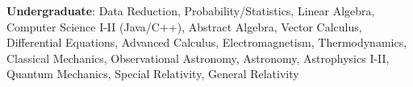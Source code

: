 \noindent\textbf{Undergraduate}:
    Data Reduction, Probability/Statistics, Linear Algebra, Computer
    Science I-II (Java/C++), Abstract Algebra, Vector Calculus,
    Differential Equations, Advanced Calculus, Electromagnetism,
    Thermodynamics, Classical Mechanics, Observational Astronomy,
    Astronomy, Astrophysics I-II,  Quantum Mechanics, Special
    Relativity, General Relativity
